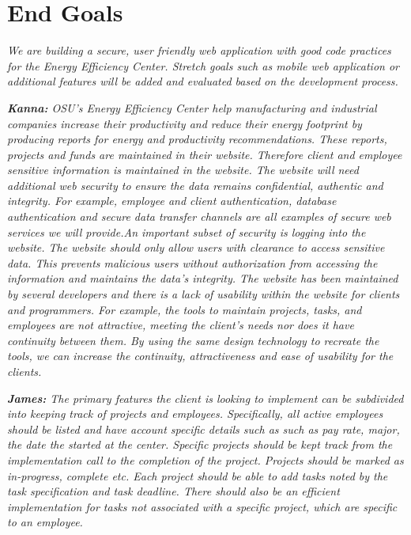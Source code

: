 \documentclass[letterpaper,10pt,titlepage,journal,compsoc,draftclsnofoot,onecolumn]{IEEEtran}
\newcommand\tab[1][1cm]{\hspace*{#1}}
\begin{document}
\section{End Goals}

\tab\textit{We are building a secure, user friendly web application with good code practices for the Energy Efficiency Center. Stretch goals such as mobile web application or additional features will be added and evaluated based on the development process.}\newline\newline


\textit{\textbf{Kanna:} \newline
\tab OSU’s Energy Efficiency Center help manufacturing and industrial companies increase their productivity and reduce their energy footprint by producing reports for energy and productivity recommendations. These reports, projects and funds are maintained in their website. Therefore client and employee sensitive information is maintained in the website. The website will need additional web security to ensure the data remains confidential, authentic and integrity. For example, employee and client authentication, database authentication and secure data transfer channels are all examples of secure web services we will provide.\newline\newline \tab An important subset of security is logging into the website. The website should only allow users  with clearance to access sensitive data. This prevents malicious users without authorization from accessing the information and maintains the data’s integrity. \newline\newline \tab The website has been maintained by several developers and there is a lack of usability within the website for clients and programmers. For example, the tools to maintain projects, tasks, and employees are not attractive, meeting the client's needs nor does it have continuity between them. By using the same design technology to recreate the tools, we can increase the continuity, attractiveness and ease of usability for the clients.\newline}


\textit{\textbf{James:} \newline
\tab The primary features the client is looking to implement can be subdivided into keeping track of projects and employees. Specifically, all active employees should be listed and have account specific details such as such as pay rate, major, the date the started at the center. Specific projects should be kept track from the implementation call to the completion of the project. Projects should be marked as in-progress, complete etc. Each project should be able to add tasks noted by the task specification and task deadline. There should also be an efficient implementation for tasks not associated with a specific project, which are specific to an employee.\newline }
\end{document}
